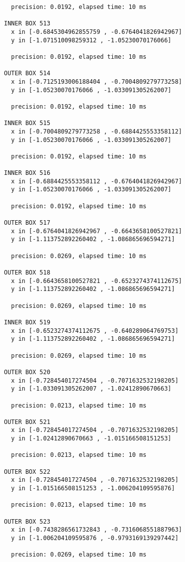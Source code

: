 \begin{verbatim}
  precision: 0.0192, elapsed time: 10 ms

INNER BOX 513
  x in [-0.6845304962855759 , -0.6764041826942967]
  y in [-1.071510098259312 , -1.05230070176066]

  precision: 0.0192, elapsed time: 10 ms

OUTER BOX 514
  x in [-0.7125193006188404 , -0.7004809279773258]
  y in [-1.05230070176066 , -1.033091305262007]

  precision: 0.0192, elapsed time: 10 ms

INNER BOX 515
  x in [-0.7004809279773258 , -0.6884425553358112]
  y in [-1.05230070176066 , -1.033091305262007]

  precision: 0.0192, elapsed time: 10 ms

INNER BOX 516
  x in [-0.6884425553358112 , -0.6764041826942967]
  y in [-1.05230070176066 , -1.033091305262007]

  precision: 0.0192, elapsed time: 10 ms

OUTER BOX 517
  x in [-0.6764041826942967 , -0.6643658100527821]
  y in [-1.113752892260402 , -1.086865696594271]

  precision: 0.0269, elapsed time: 10 ms

OUTER BOX 518
  x in [-0.6643658100527821 , -0.6523274374112675]
  y in [-1.113752892260402 , -1.086865696594271]

  precision: 0.0269, elapsed time: 10 ms

INNER BOX 519
  x in [-0.6523274374112675 , -0.640289064769753]
  y in [-1.113752892260402 , -1.086865696594271]

  precision: 0.0269, elapsed time: 10 ms

OUTER BOX 520
  x in [-0.728454017274504 , -0.7071632532198205]
  y in [-1.033091305262007 , -1.02412890670663]

  precision: 0.0213, elapsed time: 10 ms

OUTER BOX 521
  x in [-0.728454017274504 , -0.7071632532198205]
  y in [-1.02412890670663 , -1.015166508151253]

  precision: 0.0213, elapsed time: 10 ms

OUTER BOX 522
  x in [-0.728454017274504 , -0.7071632532198205]
  y in [-1.015166508151253 , -1.006204109595876]

  precision: 0.0213, elapsed time: 10 ms

OUTER BOX 523
  x in [-0.7438286561732843 , -0.7316068551887963]
  y in [-1.006204109595876 , -0.9793169139297442]

  precision: 0.0269, elapsed time: 10 ms


\end{verbatim}
